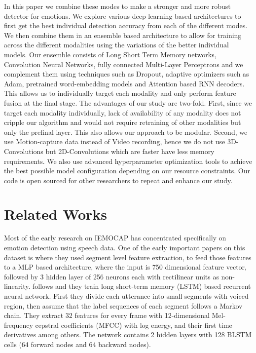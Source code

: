 \documentclass{article}
\begin{document}
In this paper we combine these modes to make a stronger and more robust detector for emotions. We explore various deep learning based architectures to first get the best individual detection accuracy from each of the different modes. We then combine them in an ensemble based architecture to allow for training across the different modalities using the variations of the better individual models. Our ensemble consists of Long Short Term Memory networks, Convolution Neural Networks, fully connected Multi-Layer Perceptrons and we complement them using techniques such as Dropout, adaptive optimizers such as Adam, pretrained word-embedding models and Attention based RNN decoders. This allows us to individually target each modality and only perform feature fusion at the final stage. The advantages of our study are two-fold. First, since we target each modality individually, lack of availability of any modality does not cripple our algorithm and would not require retraining of other modalities but only the prefinal layer. This also allows our approach to be modular. Second, we use Motion-capture data instead of Video recording, hence we do not use 3D-Convolutions but 2D-Convolutions which are faster have less memory requirements. We also use advanced hyperparameter optimization tools to achieve the best possible model configuration depending on our resource constraints. Our code is open sourced for other researchers to repeat and enhance our study.

\section{Related Works}
\label{sec:prior}

Most of the early research on IEMOCAP has concentrated specifically on emotion detection using speech data. One of the early important papers on this dataset is \cite{Han} where they used segment level feature extraction, to feed those features to a MLP based architecture, where the input is 750 dimensional feature vector, followed by 3 hidden layer of 256 neurons each with rectilinear units as non-linearity. \cite{Lee} follows \cite{Han} and they train long short-term memory (LSTM) based recurrent neural network. First they divide each utterance into small segments with voiced region, then assume that the label sequences of each segment follows a Markov chain. They extract 32 features for every frame with 12-dimensional Mel-frequency cepstral coefficients (MFCC) with log energy, and their first time derivatives among others. The network contains 2 hidden layers with 128 BLSTM cells (64 forward nodes and 64 backward nodes).
\end{document}
